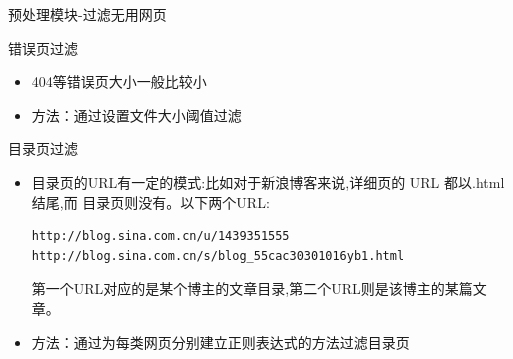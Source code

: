 \begin{frame}[fragile,label=sec-2-2]{预处理模块-过滤无用网页}
  \begin{block}{错误页过滤}
    \begin{itemize}
    \item<2->  404等错误页大小一般比较小
    \item<3->  方法：通过设置文件大小阈值过滤
    \end{itemize}
  \end{block}
  \begin{block}{目录页过滤}
  \begin{itemize}[<+->]
  \item<4-> 目录页的URL有一定的模式:比如对于新浪博客来说,详细页的 URL 都以.html 结尾,而
    目录页则没有。以下两个URL: \scriptsize
\begin{verbatim}
http://blog.sina.com.cn/u/1439351555
http://blog.sina.com.cn/s/blog_55cac30301016yb1.html
\end{verbatim}
     \normalsize
     第一个URL对应的是某个博主的文章目录,第二个URL则是该博主的某篇文章。
   \item<5-> 方法：通过为每类网页分别建立正则表达式的方法过滤目录页
    \end{itemize}     
 \end{block}
\end{frame}


